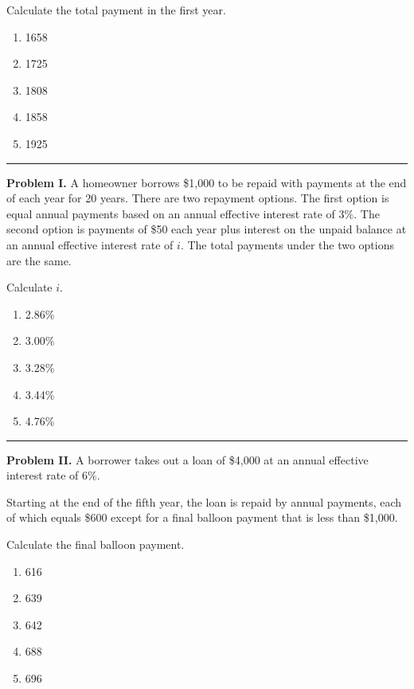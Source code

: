 \documentclass[11pt]{article}
\begin{document}
Calculate the total payment in the first year.

\begin{enumerate}[label=\Alph*., leftmargin=2.2em]
    \item 1658
    \item 1725
    \item 1808
    \item 1858
    \item 1925
\end{enumerate}

\medskip
\hrule


\newpage

\textbf{Problem I.} A homeowner borrows \$1{,}000 to be repaid with payments at the end of each year for 20 years. There are two repayment options. The first option is equal annual payments based on an annual effective interest rate of \(3\%\). The second option is payments of \$50 each year plus interest on the unpaid balance at an annual effective interest rate of \(i\). The total payments under the two options are the same.

Calculate \(i\).

\begin{enumerate}[label=\Alph*.]
    \item 2.86\%
    \item 3.00\%
    \item 3.28\%
    \item 3.44\%
    \item 4.76\%
\end{enumerate}

\medskip
\hrule

\medskip

\textbf{Problem II.} A borrower takes out a loan of \$4{,}000 at an annual effective interest rate of \(6\%\).

Starting at the end of the fifth year, the loan is repaid by annual payments, each of which equals \$600 except for a final balloon payment that is less than \$1{,}000.

Calculate the final balloon payment.

\begin{enumerate}[label=\Alph*., leftmargin=2.2em]
    \item 616
    \item 639
    \item 642
    \item 688
    \item 696
\end{enumerate}
\end{document}
